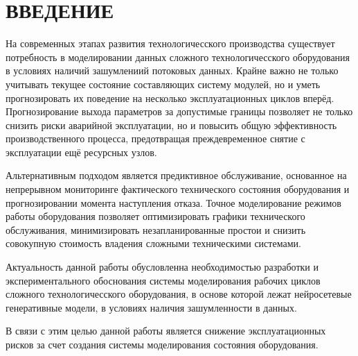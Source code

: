 \documentclass[14pt, a4paper, oneside]{extreport}
\begin{document}
\makeatletter
\renewcommand{\numberline}[1]{}
\makeatother


\setcounter{page}{5}

\tableofcontents
\clearpage



\section{ВВЕДЕНИЕ}
\vspace{1em}
На современных этапах развития технологичесского производства существует потребность в моделировании данных сложного технологичесского оборудования в условиях наличий зашумлениий потоковых данных. Крайне важно не только учитывать текущее состояние составляющих систему модулей, но и уметь прогнозировать их поведение на несколько эксплуатационных циклов вперёд. Прогнозирование выхода параметров за допустимые границы позволяет не только снизить риски аварийной эксплуатации, но и повысить общую эффективность производственного процесса, предотвращая преждевременное снятие с эксплуатации ещё ресурсных узлов.


Альтернативным подходом является предиктивное обслуживание, основанное на непрерывном мониторинге фактического технического состояния оборудования и прогнозировании момента наступления отказа. Точное моделирование режимов работы оборудования позволяет оптимизировать графики технического обслуживания, минимизировать незапланированные простои и снизить совокупную стоимость владения сложными техническими системами.

Актуальность данной работы обусловленна необходимостью разработки и экспериментального обоснования системы моделирования рабочих циклов сложного технологичесского оборудования, в основе которой лежат нейросетевые генеративные модели, в условиях наличия зашумленности в данных. 

В связи с этим целью данной работы является снижение эксплуатационных рисков за счет создания системы моделирования состояния оборудования. 
\end{document}
